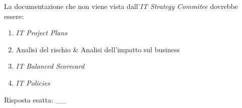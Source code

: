 \begin{Exercise} [
  title={Quiz},
  label={esPG3}
  ]

  \Question La documentazione che non viene vista dall'\textit{IT Strategy 
Commitee} dovrebbe essere:
\begin{enumerate}
 \item \textit{IT Project Plans}
 \item Analisi del rischio \& Analisi dell'impatto sul business
 \item \textit{IT Balanced Scorecard}
 \item \textit{IT Policies}
\end{enumerate}

\end{Exercise}

\begin{Answer} [
  ref={esPG3},
  number={3}
  ]

  \Question Risposta esatta: __%
\end{Answer}
